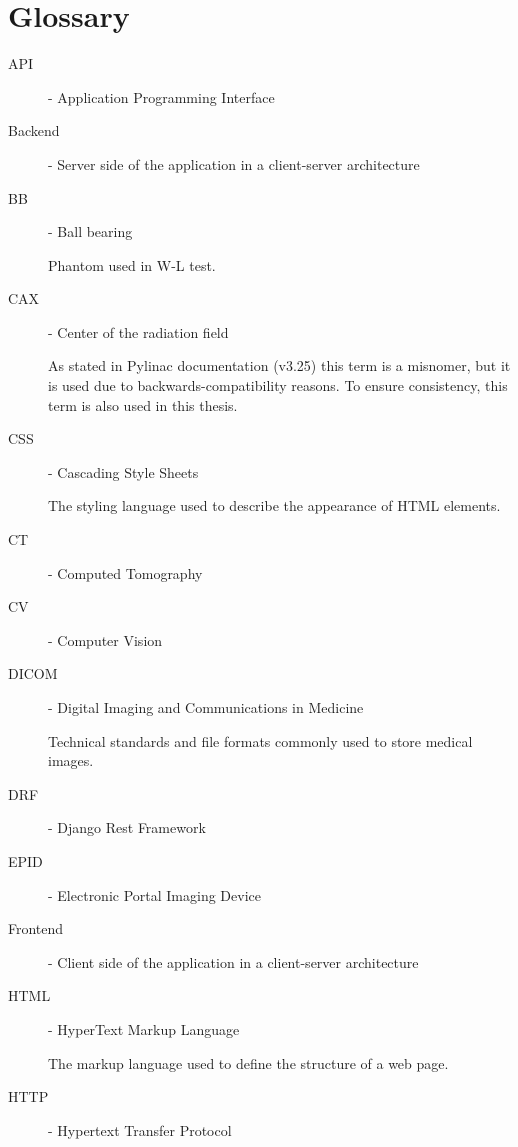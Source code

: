 \chapter{Glossary} \label{chr:glossary}

\begin{description}
    \item[API] - Application Programming Interface

    \item[Backend] - Server side of the application in a client-server architecture

    \item[BB] - Ball bearing

    Phantom used in W-L test.

    \item[CAX] - Center of the radiation field

    As stated in Pylinac documentation (v3.25) this term is a misnomer, but it is used due to backwards-compatibility reasons. To ensure consistency, this term is also used in this thesis. \cite{pylinac_cax}

    \item[CSS] - Cascading Style Sheets

    The styling language used to describe the appearance of HTML elements.

    \item[CT] - Computed Tomography

    \item[CV] - Computer Vision

    \item[DICOM] - Digital Imaging and Communications in Medicine

    Technical standards and file formats commonly used to store medical images.

    \item[DRF] - Django Rest Framework

    \item[EPID] - Electronic Portal Imaging Device

    \item[Frontend] - Client side of the application in a client-server architecture

    \item[HTML] - HyperText Markup Language

    The markup language used to define the structure of a web page.

    \item[HTTP] - Hypertext Transfer Protocol


\end{description}
